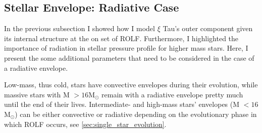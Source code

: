 \subsection{Stellar Envelope: Radiative Case}\label{sub:envelope}

In the previous subsection I showed how I model $\xi$ Tau's outer component given its internal structure at the on set of ROLF. Furthermore, I highlighted the importance of radiation in stellar pressure profile for higher mass stars. Here, I present the some additional parameters that need to be considered in the case of a radiative envelope.

Low-mass, thus cold, stars have convective envelopes during their evolution, while massive stars with M $>16$M$_{\odot}$ remain with a radiative envelope pretty much until the end of their lives. Intermediate- and high-mass stars' envelopes (M $<16$M$_{\odot}$) can be either convective or radiative depending on the evolutionary phase in which ROLF occurs, see \cref{sec:single_star_evolution}. 

